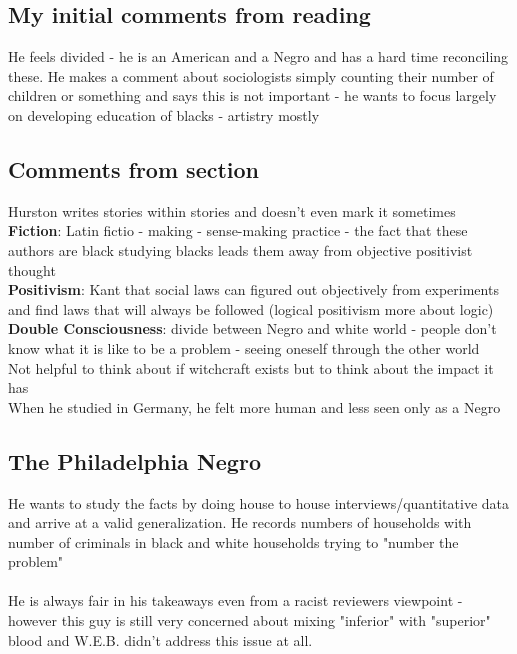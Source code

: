 \documentclass{article}
\begin{document}
\subsection{My initial comments from reading}
He feels divided - he is an American and a Negro and has a hard time reconciling these. He makes a comment about sociologists simply counting their number of children or something and says this is not important - he wants to focus largely on developing education of blacks - artistry mostly
\subsection{Comments from section}
Hurston writes stories within stories and doesn't even mark it sometimes \\
\textbf{Fiction}: Latin fictio - making - sense-making practice - the fact that these authors are black studying blacks leads them away from objective positivist thought \\
\textbf{Positivism}: Kant that social laws can figured out objectively from experiments and find laws that will always be followed (logical positivism more about logic) \\
\textbf{Double Consciousness}: divide between Negro and white world - people don't know what it is like to be a problem - seeing oneself through the other world \\
Not helpful to think about if witchcraft exists but to think about the impact it has \\ 
When he studied in Germany, he felt more human and less seen only as a Negro

\subsection{The Philadelphia Negro}
He wants to study the facts by doing house to house interviews/quantitative data and arrive at a valid generalization. He records numbers of households with number of criminals in black and white households trying to "number the problem" \\ \\
He is always fair in his takeaways even from a racist reviewers viewpoint - however this guy is still very concerned about mixing "inferior" with "superior" blood and W.E.B. didn't address this issue at all.
\end{document}
